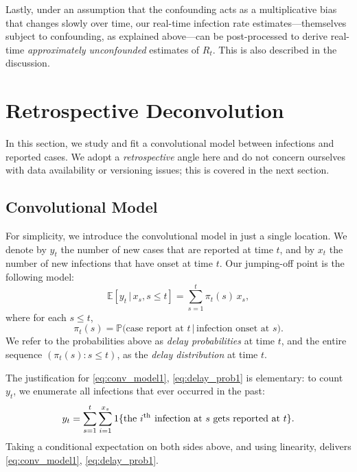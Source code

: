 \documentclass[sts]{imsart}
\def\E{\mathbb{E}}
\def\P{\mathbb{P}}
\def\th{^\mathrm{th}}
\theoremstyle{plain}
\theoremstyle{definition}
\theoremstyle{remark}
\begin{document}
Lastly, under an assumption that the confounding acts as a multiplicative bias
that changes slowly over time, our real-time infection rate
estimates---themselves subject to confounding, as explained above---can be
post-processed to derive real-time \emph{approximately unconfounded} estimates
of $R_t$. This is also described in the discussion.

\section{Retrospective Deconvolution}
\label{sec:deconv_retro}

In this section, we study and fit a convolutional model between infections and  
reported cases. We adopt a \emph{retrospective} angle here and do not concern
ourselves with data availability or versioning issues; this is covered in the
next section.   

\subsection{Convolutional Model}
\label{sec:conv_model}

For simplicity, we introduce the convolutional model in just a single
location. We denote by $y_t$ the number of new cases that are reported at time
$t$, and by $x_t$ the number of new infections that have onset at time $t$. Our
jumping-off point is the following model:
\begin{equation}
\label{eq:conv_model1}
\E[y_t \,|\, x_s, s \leq t] = \sum_{s=1}^t \pi_t(s) \, x_s, 
\end{equation}
where for each $s \leq t$,
\begin{equation}
\label{eq:delay_prob1}
\pi_t(s) = \P\big( \text{case report at $t$} \,|\, \text{infection onset at   
  $s$} \big). 
\end{equation}
We refer to the probabilities above as \emph{delay probabilities} at time $t$,
and the entire sequence $(\pi_t(s) : s \leq t)$, as the \emph{delay
  distribution} at time $t$. 

The justification for \eqref{eq:conv_model1}, \eqref{eq:delay_prob1} is
elementary: to count $y_t$, we enumerate all infections that ever occurred in
the past:  
\[
y_t = \sum_{s=1}^t \sum_{i=1}^{x_s} 1\{\text{the $i\th$ \hspace{-3pt} infection   
  at $s$ gets reported at $t$}\}.
\]
Taking a conditional expectation on both sides above, and using linearity,
delivers \eqref{eq:conv_model1}, \eqref{eq:delay_prob1}.
\end{document}
